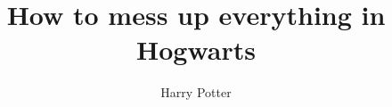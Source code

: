 \documentclass{swfu3in1}
\title{How to mess up everything in Hogwarts}
\author{Harry Potter}
\begin{document}
\makeproposal{}%
\clearpage
\maketaskspec{} %
\clearpage
\makeplan{} %
\end{document}
